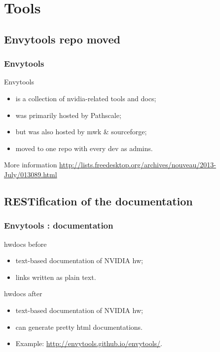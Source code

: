 \documentclass[11pt,english,compress]{beamer}
\begin{document}
\section{Tools}

\subsection{Envytools repo moved}
\begin{frame}
	\frametitle{Envytools}

	\begin{block}{Envytools}
		\begin{itemize}
			\item is a collection of nvidia-related tools and docs;
			\item was primarily hosted by Pathscale;
			\item but was also hosted by mwk \& sourceforge;
			\item moved to one repo with every dev as admins.
		\end{itemize}
	\end{block}

	\begin{block}{More information}
		\url{http://lists.freedesktop.org/archives/nouveau/2013-July/013089.html}
	\end{block}
\end{frame}

\subsection{RESTification of the documentation}
\begin{frame}
	\frametitle{Envytools : documentation}

	\begin{block}{hwdocs before}
		\begin{itemize}
			\item text-based documentation of NVIDIA hw;
			\item links written as plain text.
		\end{itemize}
	\end{block}

	\begin{block}{hwdocs after}
		\begin{itemize}
			\item text-based documentation of NVIDIA hw;
			\item can generate pretty html documentations.
			\item Example: \url{http://envytools.github.io/envytools/}.
		\end{itemize}
	\end{block}
\end{frame}
\end{document}
